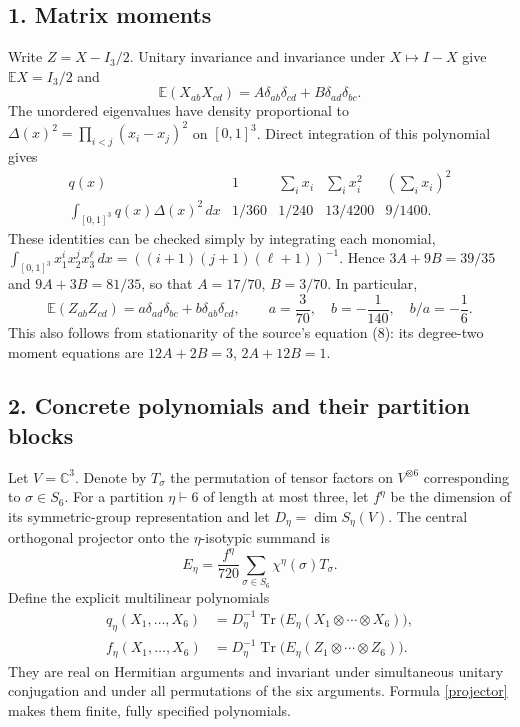 \documentclass[11pt]{article}
\newcommand{\Tr}{\operatorname{Tr}}
\newcommand{\E}{\mathbb E}
\begin{document}
\subsection*{1. Matrix moments}
Write $Z=X-I_3/2$. Unitary invariance and invariance under $X\mapsto I-X$
give $\E X=I_3/2$ and
\[
 \E(X_{ab}X_{cd})=A\delta_{ab}\delta_{cd}
                         +B\delta_{ad}\delta_{bc}.
\]
The unordered eigenvalues have density proportional to
$\Delta(x)^2=\prod_{i<j}(x_i-x_j)^2$ on $[0,1]^3$.
Direct integration of this polynomial gives
\[
\begin{array}{c|cccc}
 q(x)&1&\sum_i x_i&\sum_i x_i^2&(\sum_i x_i)^2\\ \hline
 \int_{[0,1]^3}q(x)\Delta(x)^2\,dx
 &1/360&1/240&13/4200&9/1400.
\end{array}
\]
These identities can be checked simply by integrating each monomial,
$\int_{[0,1]^3}x_1^ix_2^jx_3^\ell\,dx=
((i+1)(j+1)(\ell+1))^{-1}$.
Hence $3A+9B=39/35$ and $9A+3B=81/35$, so that
$A=17/70$, $B=3/70$. In particular,
\begin{equation}\label{cov}
 \E(Z_{ab}Z_{cd})
 =a\delta_{ad}\delta_{bc}+b\delta_{ab}\delta_{cd},
 \qquad a=\frac3{70},\quad b=-\frac1{140},\quad b/a=-\frac16.
\end{equation}
This also follows from stationarity of the source's equation (8):
its degree-two moment equations are $12A+2B=3$, $2A+12B=1$.

\subsection*{2. Concrete polynomials and their partition blocks}
Let $V=\mathbb C^3$. Denote by $T_\sigma$ the permutation of tensor
factors on $V^{\otimes6}$ corresponding to $\sigma\in S_6$.
For a partition $\eta\vdash6$ of length at most three, let $f^\eta$
be the dimension of its symmetric-group representation and let
$D_\eta=\dim S_\eta(V)$. The central orthogonal projector onto
the $\eta$-isotypic summand is
\begin{equation}\label{projector}
 E_\eta=\frac{f^\eta}{720}
              \sum_{\sigma\in S_6}\chi^\eta(\sigma)T_\sigma.
\end{equation}
Define the explicit multilinear polynomials
\begin{align*}
 q_\eta(X_1,\ldots,X_6)
   &=D_\eta^{-1}\Tr\bigl(E_\eta(X_1\otimes\cdots\otimes X_6)\bigr),\\
 f_\eta(X_1,\ldots,X_6)
   &=D_\eta^{-1}\Tr\bigl(E_\eta(Z_1\otimes\cdots\otimes Z_6)\bigr).
\end{align*}
They are real on Hermitian arguments and invariant under simultaneous
unitary conjugation and under all permutations of the six arguments.
Formula \eqref{projector} makes them finite, fully specified polynomials.
\end{document}
